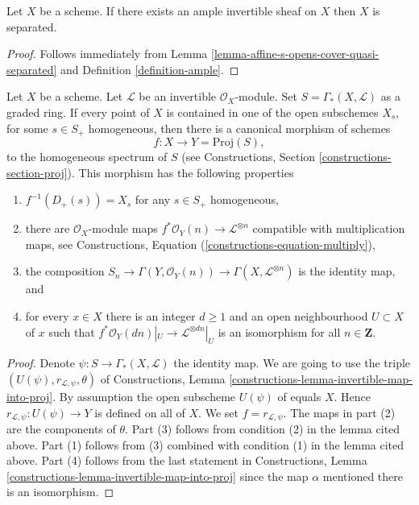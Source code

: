 \begin{lemma}
\label{lemma-ample-separated}
Let $X$ be a scheme. If there exists an ample invertible sheaf on $X$
then $X$ is separated.
\end{lemma}

\begin{proof}
Follows immediately from
Lemma \ref{lemma-affine-s-opens-cover-quasi-separated} and
Definition \ref{definition-ample}.
\end{proof}

\begin{lemma}
\label{lemma-map-into-proj}
Let $X$ be a scheme.
Let $\mathcal{L}$ be an invertible $\mathcal{O}_X$-module.
Set $S = \Gamma_*(X, \mathcal{L})$ as a graded ring.
If every point of $X$ is contained in one of the
open subschemes $X_s$, for some $s \in S_{+}$ homogeneous, then
there is a canonical morphism of schemes
$$
f : X \longrightarrow Y = \text{Proj}(S),
$$
to the homogeneous spectrum of $S$ (see
Constructions, Section \ref{constructions-section-proj}).
This morphism has the following properties
\begin{enumerate}
\item $f^{-1}(D_{+}(s)) = X_s$ for any $s \in S_{+}$ homogeneous,
\item there are $\mathcal{O}_X$-module maps
$f^*\mathcal{O}_Y(n) \to \mathcal{L}^{\otimes n}$
compatible with multiplication maps, see
Constructions, Equation (\ref{constructions-equation-multiply}),
\item the composition
$S_n \to \Gamma(Y, \mathcal{O}_Y(n)) \to \Gamma(X, \mathcal{L}^{\otimes n})$
is the identity map, and
\item for every $x \in X$ there is an integer $d \geq 1$
and an open neighbourhood $U \subset X$ of $x$
such that $f^*\mathcal{O}_Y(dn)|_U \to \mathcal{L}^{\otimes dn}|_U$
is an isomorphism for all $n \in \mathbf{Z}$.
\end{enumerate}
\end{lemma}

\begin{proof}
Denote $\psi : S \to \Gamma_*(X, \mathcal{L})$ the identity map.
We are going to use the triple
$(U(\psi), r_{\mathcal{L}, \psi}, \theta)$ of
Constructions, Lemma \ref{constructions-lemma-invertible-map-into-proj}.
By assumption the open subscheme $U(\psi)$ of equals $X$. Hence
$r_{\mathcal{L}, \psi} : U(\psi) \to Y$ is defined on all of $X$.
We set $f = r_{\mathcal{L}, \psi}$.
The maps in part (2) are the components of $\theta$.
Part (3) follows from condition (2) in the lemma cited above.
Part (1) follows from (3) combined with condition (1) in the lemma
cited above. Part (4) follows from the last statement in
Constructions, Lemma \ref{constructions-lemma-invertible-map-into-proj}
since the map $\alpha$ mentioned there is an isomorphism.
\end{proof}

